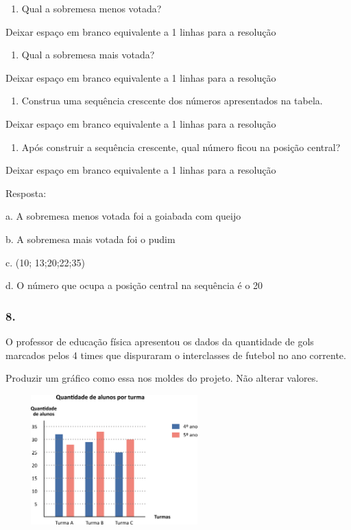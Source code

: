 \begin{enumerate}
\def\labelenumi{\alph{enumi})}
\item
  Qual a sobremesa menos votada?
\end{enumerate}

Deixar espaço em branco equivalente a 1 linhas para a resolução

\begin{enumerate}
\def\labelenumi{\alph{enumi})}
\item
  Qual a sobremesa mais votada?
\end{enumerate}

Deixar espaço em branco equivalente a 1 linhas para a resolução

\begin{enumerate}
\def\labelenumi{\alph{enumi})}
\item
  Construa uma sequência crescente dos números apresentados na tabela.
\end{enumerate}

Deixar espaço em branco equivalente a 1 linhas para a resolução

\begin{enumerate}
\def\labelenumi{\alph{enumi})}
\item
  Após construir a sequência crescente, qual número ficou na posição
  central?
\end{enumerate}

Deixar espaço em branco equivalente a 1 linhas para a resolução

Resposta:

a. A sobremesa menos votada foi a goiabada com queijo

b. A sobremesa mais votada foi o pudim

c. (10; 13;20;22;35)

d. O número que ocupa a posição central na sequência é o 20

\subsubsection{8.}\label{section-115}

O professor de educação física apresentou os dados da quantidade de gols
marcados pelos 4 times que dispuraram o interclasses de futebol no ano
corrente.

Produzir um gráfico como essa nos moldes do projeto. Não alterar
valores.

\includegraphics[width=3.30769in,height=1.97201in]{media/image97.png}

